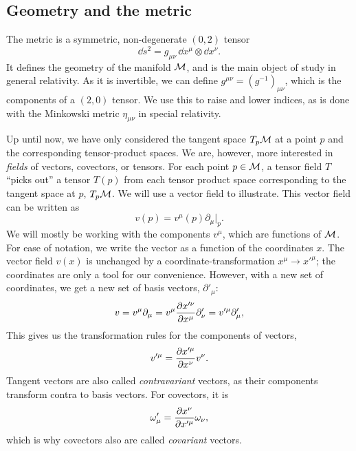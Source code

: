 \subsection{Geometry and the metric}
\label{subsection: goemetry and the metric}

The metric is a symmetric, non-degenerate $(0, 2)$ tensor
%
\begin{equation}
    \dd s^2 = g_{\mu \nu} \, \dd x^\mu \otimes \dd x^\nu.
\end{equation}
%
It defines the geometry of the manifold $\mathcal{M}$, and is the main object of study in general relativity.
As it is invertible, we can define $g^{\mu \nu} = (g^{-1})_{\mu \nu}$, which is the components of a $(2, 0)$ tensor.
We use this to raise and lower indices, as is done with the Minkowski metric $\eta_{\mu \nu}$ in special relativity.

Up until now, we have only considered the tangent space $T_p \mathcal{M}$ at a point $p$ and the corresponding tensor-product spaces.
We are, however, more interested in \emph{fields} of vectors, covectors, or tensors.
For each point $p \in \mathcal{M}$, a tensor field $T$ ``picks out'' a tensor $T(p)$ from each tensor product space corresponding to the tangent space at $p$, $T_p \mathcal{M}$.
We will use a vector field to illustrate.
This vector field can be written as
%
\begin{equation}
    v(p) = v^\mu(p) \partial_\mu |_p. 
\end{equation}
%
We will mostly be working with the components $v^\mu$, which are functions of $\mathcal{M}$.
For ease of notation, we write the vector as a function of the coordinates $x$.
The vector field $v(x)$ is unchanged by a coordinate-transformation $x^\mu \rightarrow {x'}^\mu$; the coordinates are only a tool for our convenience.
However, with a new set of coordinates, we get a new set of basis vectors, $\partial'_\mu$:
%
\begin{equation}
    v = v^\mu \partial_\mu = v^\mu \pdv{x'^\nu}{x^\mu} \partial'_\nu
    = v'^\mu \partial_\mu',
\end{equation}
%
This gives us the transformation rules for the components of vectors,
%
\begin{equation}
    v'^\mu = \pdv{x'^\mu}{x^\nu} v^\nu.
\end{equation}
%
Tangent vectors are also called \emph{contravariant} vectors, as their components transform contra to basis vectors.
For covectors, it is
%
\begin{equation}
    \omega'_\mu = \pdv{x^\nu}{x'^\mu} \omega_\nu,
\end{equation}
%
which is why covectors also are called \emph{covariant} vectors.

